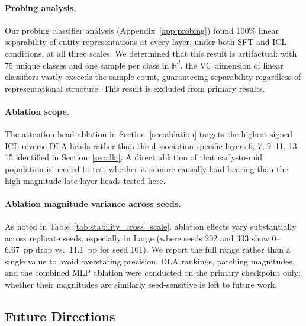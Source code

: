 \documentclass[11pt]{article}
\begin{document}
\paragraph{Probing analysis.} Our probing classifier analysis
(Appendix~\ref{app:probing}) found 100\% linear separability of entity
representations at every layer, under both SFT and ICL conditions, at all three
scales. We determined that this result is artifactual: with 75 unique classes
and one sample per class in $\mathbb{R}^d$, the VC dimension of linear
classifiers vastly exceeds the sample count, guaranteeing separability regardless
of representational structure. This result is excluded from primary results.

\paragraph{Ablation scope.} The attention head ablation in
Section~\ref{sec:ablation} targets the highest signed ICL-reverse DLA heads
rather than the dissociation-specific layers 6, 7, 9--11, 13--15 identified
in Section~\ref{sec:dla}. A direct ablation of that early-to-mid population
is needed to test whether it is more causally load-bearing than the high-magnitude
late-layer heads tested here.

\paragraph{Ablation magnitude variance across seeds.} As noted in
Table~\ref{tab:stability_cross_scale}, ablation effects vary substantially across
replicate seeds, especially in Large (where seeds 202 and 303 show 0--6.67~pp
drop vs.\ 11.1~pp for seed 101). We report the full range rather than a
single value to avoid overstating precision. DLA rankings, patching magnitudes,
and the combined MLP ablation were conducted on the primary checkpoint only;
whether their magnitudes are similarly seed-sensitive is left to future work.

\subsection{Future Directions}
\label{sec:future}
\end{document}
